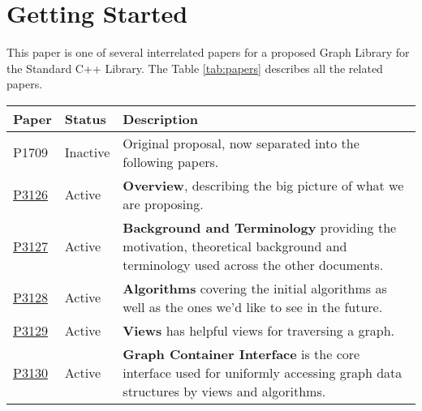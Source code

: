 
\section{Getting Started}

This paper is one of several interrelated papers for a proposed Graph Library for the Standard C++ Library. 
The Table \ref{tab:papers} describes all the related papers. 

\begin{table}[h!]
    \begin{center}
    {\begin{tabular}{l l p{14cm}}
       \hline
       \textbf{Paper}     & \textbf{Status} & \textbf{Description}                                                                                                                                                                             \\
       \hline
       P1709              & Inactive       & Original proposal, now separated into the following papers. \\
       \hdashline
       \href{https://www.wg21.link/P3126}{P3126} & Active         & \textbf{Overview}, describing the big picture of what we are proposing. \\
       \href{https://www.wg21.link/P3127}{P3127} & Active         & \textbf{Background and Terminology} providing the motivation, theoretical background and terminology used across the other documents.\\
       \href{https://www.wg21.link/P3128}{P3128} & Active         & \textbf{Algorithms} covering the initial algorithms 
                                             as well as the ones we'd like to see in the future. \\
       \href{https://www.wg21.link/P3129}{P3129} & Active         & \textbf{Views} has helpful views for traversing a graph. \\
       \href{https://www.wg21.link/P3130}{P3130} & Active         & \textbf{Graph Container Interface} is the core interface used
                                             for uniformly accessing graph data structures by views and algorithms.

\end{tabular}}
\end{center}
\end{table}
